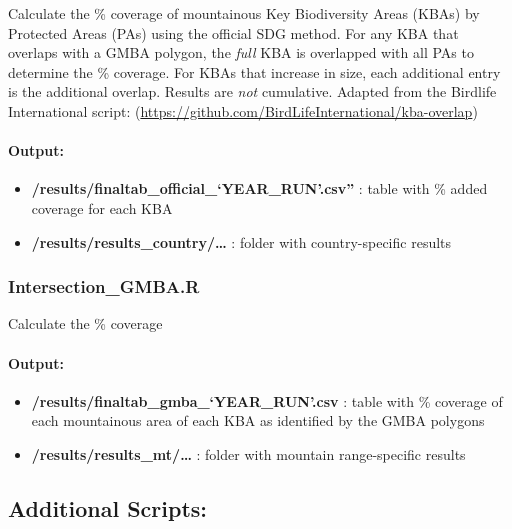 \documentclass[
]{article}
\providecommand{\tightlist}{%
  \setlength{\itemsep}{0pt}\setlength{\parskip}{0pt}}
\begin{document}
Calculate the \% coverage of mountainous Key Biodiversity Areas (KBAs)
by Protected Areas (PAs) using the official SDG method. For any KBA that
overlaps with a GMBA polygon, the \emph{full} KBA is overlapped with all
PAs to determine the \% coverage. For KBAs that increase in size, each
additional entry is the additional overlap. Results are \emph{not}
cumulative. Adapted from the Birdlife International script:
(\url{https://github.com/BirdLifeInternational/kba-overlap})

\hypertarget{output}{%
\paragraph{Output:}\label{output}}

\begin{itemize}
\tightlist
\item
  \textbf{/results/finaltab\_official\_`YEAR\_RUN'.csv''} : table with
  \% added coverage for each KBA
\item
  \textbf{/results/results\_country/\ldots{}} : folder with
  country-specific results
\end{itemize}

\hypertarget{intersection_gmba.r}{%
\subsubsection{Intersection\_GMBA.R}\label{intersection_gmba.r}}

Calculate the \% coverage

\hypertarget{output-1}{%
\paragraph{Output:}\label{output-1}}

\begin{itemize}
\tightlist
\item
  \textbf{/results/finaltab\_gmba\_`YEAR\_RUN'.csv} : table with \%
  coverage of each mountainous area of each KBA as identified by the
  GMBA polygons
\item
  \textbf{/results/results\_mt/\ldots{}} : folder with mountain
  range-specific results
\end{itemize}

\hypertarget{additional-scripts}{%
\subsection{Additional Scripts:}\label{additional-scripts}}
\end{document}
